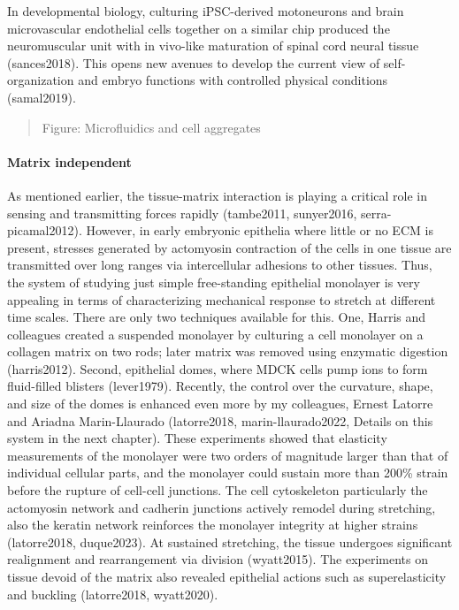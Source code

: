 \documentclass[
]{article}
\begin{document}
In developmental biology, culturing iPSC-derived motoneurons and brain
microvascular endothelial cells together on a similar chip produced the
neuromuscular unit with in vivo-like maturation of spinal cord neural
tissue (sances2018). This opens new avenues to develop the current view
of self-organization and embryo functions with controlled physical
conditions (samal2019).

\begin{quote}
Figure: Microfluidics and cell aggregates
\end{quote}

\hypertarget{matrix-independent}{%
\paragraph{Matrix independent}\label{matrix-independent}}

As mentioned earlier, the tissue-matrix interaction is playing a
critical role in sensing and transmitting forces rapidly (tambe2011,
sunyer2016, serra-picamal2012). However, in early embryonic epithelia
where little or no ECM is present, stresses generated by actomyosin
contraction of the cells in one tissue are transmitted over long ranges
via intercellular adhesions to other tissues. Thus, the system of
studying just simple free-standing epithelial monolayer is very
appealing in terms of characterizing mechanical response to stretch at
different time scales. There are only two techniques available for this.
One, Harris and colleagues created a suspended monolayer by culturing a
cell monolayer on a collagen matrix on two rods; later matrix was
removed using enzymatic digestion (harris2012). Second, epithelial
domes, where MDCK cells pump ions to form fluid-filled blisters
(lever1979). Recently, the control over the curvature, shape, and size
of the domes is enhanced even more by my colleagues, Ernest Latorre and
Ariadna Marin-Llaurado (latorre2018, marin-llaurado2022, Details on this
system in the next chapter). These experiments showed that elasticity
measurements of the monolayer were two orders of magnitude larger than
that of individual cellular parts, and the monolayer could sustain more
than 200\% strain before the rupture of cell-cell junctions. The cell
cytoskeleton particularly the actomyosin network and cadherin junctions
actively remodel during stretching, also the keratin network reinforces
the monolayer integrity at higher strains (latorre2018, duque2023). At
sustained stretching, the tissue undergoes significant realignment and
rearrangement via division (wyatt2015). The experiments on tissue devoid
of the matrix also revealed epithelial actions such as superelasticity
and buckling (latorre2018, wyatt2020).
\end{document}
